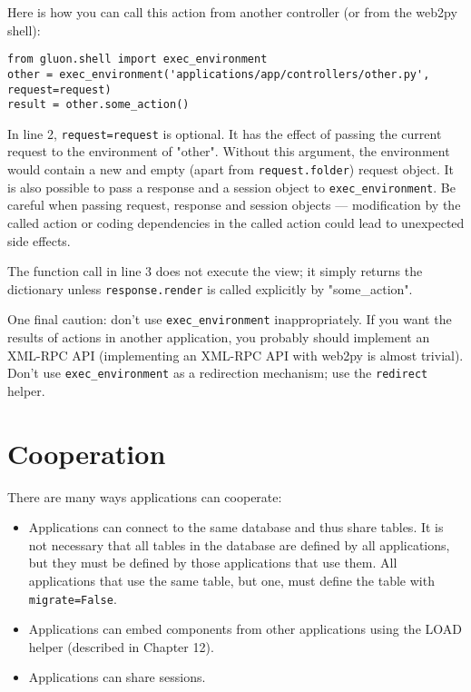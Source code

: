 \documentclass[justified,sixbynine,notoc]{tufte-book}
\def\ft{\small\tt}
\def\inxx#1{\index{#1}}
\begin{document}
\begin{fullwidth}
Here is how you can call this action from another controller (or from the web2py shell):
\begin{lstlisting}
from gluon.shell import exec_environment
other = exec_environment('applications/app/controllers/other.py', request=request)
result = other.some_action()
\end{lstlisting}

In line 2, {\ft request=request} is optional. It has the effect of passing the current request to the environment of "other". Without this argument, the environment would contain a new and empty (apart from {\ft request.folder}) request object. It is also possible to pass a response and a session object to {\ft exec\_environment}. Be careful when passing request, response and session objects --- modification by the called action or coding dependencies in the called action could lead to unexpected side effects.

The function call in line 3 does not execute the view; it simply returns the dictionary unless {\ft response.render} is called explicitly by "some\_action".

One final caution: don't use {\ft exec\_environment} inappropriately. If you want the results of actions in another application, you probably should implement an XML-RPC API (implementing an XML-RPC API with web2py is almost trivial). Don't use {\ft exec\_environment} as a redirection mechanism; use the {\ft redirect} helper.

\goodbreak\section{Cooperation}

\inxx{cooperation}

There are many ways applications can cooperate:
\begin{itemize}
\item Applications can connect to the same database and thus share tables. It is not necessary that all tables in the database are defined by all applications, but they must be defined by those applications that use them. All applications that use the same table, but one, must define the table with {\ft migrate=False}.

\item Applications can embed components from other applications using the LOAD helper (described in Chapter 12).

\item Applications can share sessions.


\end{itemize}
\end{fullwidth}
\end{document}
